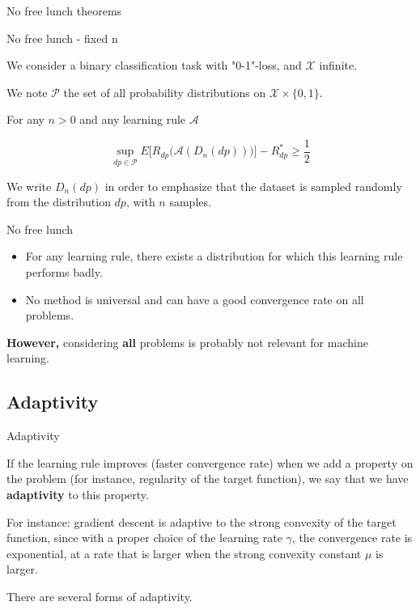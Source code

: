 \documentclass[usenames,dvipsnames]{beamer}
\begin{document}
\begin{frame}{No free lunch theorems}


    \begin{theorem}{No free lunch - fixed n}

	We consider a binary classification task with "0-1"-loss, and $ \mathcal{X} $ infinite.

	We note $ \mathcal{P} $ the set of all probability distributions on $ \mathcal{X} \times \{0, 1\}$.

	For any $n>0$ and any learning rule $ \mathcal{A} $

	\begin{equation}
	    \sup_{ dp\in \mathcal{P} } E\Big[ R_{dp}\big( \mathcal{A} (D_n(dp)) \big) \Big]- R_{dp}^*\geq \frac{1}{2} 
	\end{equation}

    \end{theorem}

    We write $D_n(dp)$ in order to emphasize that the dataset is sampled randomly from the distribution $dp$, with $n$ samples.
\end{frame}


\begin{frame}{No free lunch}

    \begin{itemize}
	\item For any learning rule, there exists a distribution for which this learning rule performs badly.
	\item No method is universal and can have a good convergence rate on all problems.
    \end{itemize}

    \textbf{{However,}} considering \textbf{{all}} problems is probably not relevant for machine learning.
\end{frame}

\subsection{Adaptivity}%
\label{sub:adaptivity}

\begin{frame}{Adaptivity}

    If the learning rule improves (faster convergence rate) when we add a property on the problem (for instance, regularity of the target function), we say that we have \textbf{adaptivity} to this property.

    For instance: gradient descent is adaptive to the strong convexity of the target function, since with a proper choice of the learning rate $ \gamma$, the convergence rate is exponential, at a rate that is larger when the strong convexity constant $\mu$ is larger.

    There are several forms of adaptivity.
    
\end{frame}
\end{document}
